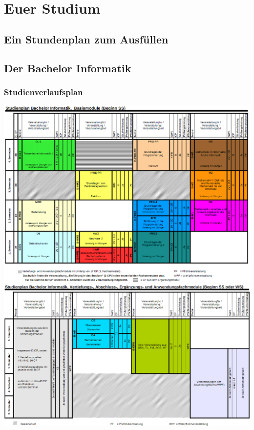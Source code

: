 \documentclass[12pt,a4paper]{scrartcl}
\begin{document}
\section{Euer Studium}
\subsection{Ein Stundenplan zum Ausfüllen}

\subsection{Der Bachelor Informatik}
\subsubsection{Studienverlaufsplan}
\includegraphics[width=18cm]{bilder/basismodulebachelorSS}
\newline
\includegraphics[width=18cm]{bilder/sonstigemodulebachelor}
\newpage
\end{document}
